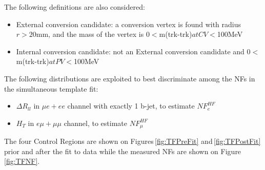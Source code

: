 The following definitions are also considered:

\begin{itemize}
\item External conversion candidate: a conversion vertex is found with radius $r>20$mm, and the mass of the vertex is 0$<$m(trk-trk)$ at CV<$100MeV 
\item Internal conversion candidate: not an External conversion candidate and 0$<$m(trk-trk)$ at PV<$100MeV 
\end{itemize}

The following distributions are exploited to best discriminate among the NFs
in the simultaneous template fit:  

\begin{itemize}
\item  $\Delta R_{ll}$ in $\mu e + ee$ channel with exactly 1 b-jet, to estimate $NF^{HF}_{e}$
\item  $H_T$ in $e\mu+\mu\mu$ channel, to estimate $NF^{HF}_{\mu}$%
\end{itemize}

The four Control Regions are shown on Figures\,\ref{fig:TFPreFit}
and\,\ref{fig:TFPostFit} prior and after the fit to data while the measured NFs
are shown on Figure\,\ref{fig:TFNF}.

